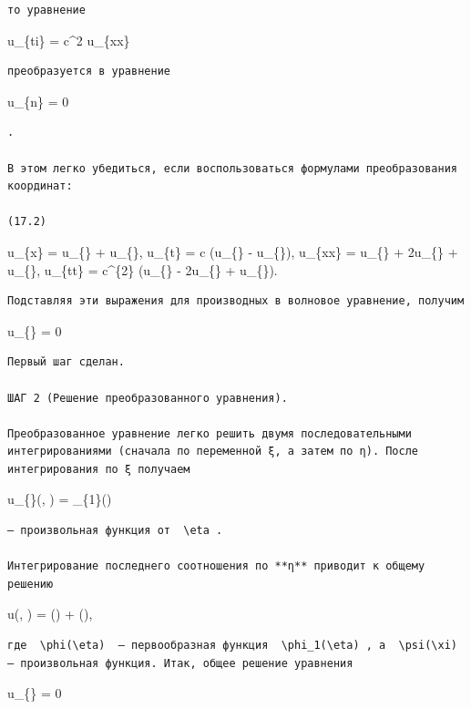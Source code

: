 \documentclass[
  ukrainian,
]{article}
\begin{document}
\begin{verbatim}
то уравнение
\end{verbatim}

u\_\{ti\} = c\^{}2 u\_\{xx\}

\begin{verbatim}
преобразуется в уравнение
\end{verbatim}

u\_\{\xi n\} = 0

\begin{verbatim}
.

В этом легко убедиться, если воспользоваться формулами преобразования координат:

(17.2)
\end{verbatim}

u\_\{x\} = u\_\{\xi\} + u\_\{\eta\}, u\_\{t\} = c (u\_\{\xi\} -
u\_\{\eta\}), u\_\{xx\} = u\_\{\xi\xi\} + 2u\_\{\xi\eta\} +
u\_\{\eta\eta\}, u\_\{tt\} = c\^{}\{2\} (u\_\{\xi\xi\} - 2u\_\{\xi\eta\}
+ u\_\{\eta\eta\}).

\begin{verbatim}
Подставляя эти выражения для производных в волновое уравнение, получим
\end{verbatim}

u\_\{\xi\eta\} = 0

\begin{verbatim}
Первый шаг сделан.

ШАГ 2 (Решение преобразованного уравнения).

Преобразованное уравнение легко решить двумя последовательными интегрированиями (сначала по переменной ξ, а затем по η). После интегрирования по ξ получаем
\end{verbatim}

u\_\{\eta\}(\xi, \eta) = \varphi\_\{1\}(\eta)

\begin{verbatim}
— произвольная функция от  \eta .

Интегрирование последнего соотношения по **η** приводит к общему решению
\end{verbatim}

u(\xi, \eta) = \varphi(\eta) + \psi(\xi),

\begin{verbatim}
где  \phi(\eta)  — первообразная функция  \phi_1(\eta) , а  \psi(\xi)  — произвольная функция. Итак, общее решение уравнения
\end{verbatim}

u\_\{\xi\eta\} = 0
\end{document}
